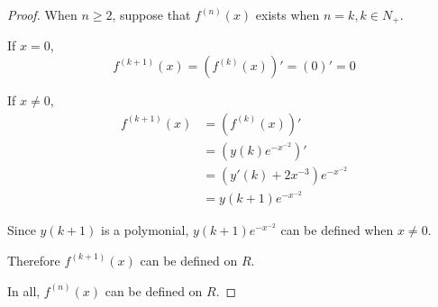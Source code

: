 \documentclass{article}
\begin{document}
\begin{enumerate}[(a)]
\begin{proof}
            When $n \geq 2$, suppose that $f^{(n)}(x)$ exists when $n = k, k \in N_+$.

            If $x = 0$, $$f^{(k + 1)}(x) = (f^{(k)}(x))' = (0)' = 0$$

            If $x \not = 0$, $$\begin{aligned}
                f^{(k + 1)}(x) &= (f^{(k)}(x))' \\
                &= (y(k)e^{-x^{-2}})' \\
                &= (y'(k) + 2x^{-3})e^{-x^{-2}} \\
                &= y(k + 1)e^{-x^{-2}}
            \end{aligned}$$

            Since $y(k + 1)$ is a polymonial, $y(k + 1)e^{-x^{-2}}$ can be defined when $x \not = 0$.

            Therefore $f^{(k + 1)}(x)$ can be defined on $R$.

            In all, $f^{(n)}(x)$ can be defined on $R$.


        \end{proof}

    \end{enumerate}
\end{document}
